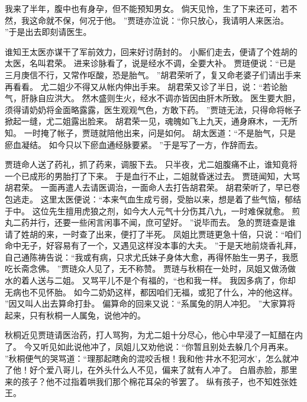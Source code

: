 我来了半年，腹中也有身孕，但不能预知男女。
倘天见怜，生了下来还可，若不然，我这命就不保，何况于他。
”贾琏亦泣说：“你只放心，我请明人来医治。
”于是出去即刻请医生。
\par
谁知王太医亦谋干了军前效力，回来好讨荫封的。
小厮们走去，便请了个姓胡的太医，名叫君荣。
进来诊脉看了，说是经水不调，全要大补。
贾琏便说：“已是三月庚信不行，又常作呕酸，恐是胎气。
”胡君荣听了，复又命老婆子们请出手来再看看。
尤二姐少不得又从帐内伸出手来。
胡君荣又诊了半日，说：“若论胎气，肝脉自应洪大。
然木盛则生火，经水不调亦皆因由肝木所致。
医生要大胆，须得请奶奶将金面略露露，医生观观气色，方敢下药。
”贾琏无法，只得命将帐子掀起一缝，尤二姐露出脸来。
胡君荣一见，魂魄如飞上九天，通身麻木，一无所知。
一时掩了帐子，贾琏就陪他出来，问是如何。
胡太医道：“不是胎气，只是瘀血凝结。
如今只以下瘀血通经脉要紧。
”于是写了一方，作辞而去。
\par
贾琏命人送了药礼，抓了药来，调服下去。
只半夜，尤二姐腹痛不止，谁知竟将一个已成形的男胎打了下来。
于是血行不止，二姐就昏迷过去。
贾琏闻知，大骂胡君荣。
一面再遣人去请医调治，一面命人去打告胡君荣。
胡君荣听了，早已卷包逃走。
这里太医便说：“本来气血生成亏弱，受胎以来，想是着了些气恼，郁结于中。
这位先生擅用虎狼之剂，如今大人元气十分伤其八九，一时难保就愈。
煎丸二药并行，还要一些闲言闲事不闻，庶可望好。
”说毕而去。
急的贾琏查是谁请了姓胡的来，一时查了出来，便打了半死。
凤姐比贾琏更急十倍，只说：“咱们命中无子，好容易有了一个，又遇见这样没本事的大夫。
”于是天地前烧香礼拜，自己通陈祷告说：“我或有病，只求尤氏妹子身体大愈，再得怀胎生一男子，我愿吃长斋念佛。
”贾琏众人见了，无不称赞。
贾琏与秋桐在一处时，凤姐又做汤做水的着人送与二姐。
又骂平儿不是个有福的，“也和我一样。
我因多病了，你却无病也不见怀胎。
如今二奶奶这样，都因咱们无福，或犯了什么，冲的他这样。
”因又叫人出去算命打卦。
偏算命的回来又说：“系属兔的阴人冲犯。
”大家算将起来，只有秋桐一人属兔，说他冲的。
\par
秋桐近见贾琏请医治药，打人骂狗，为尤二姐十分尽心，他心中早浸了一缸醋在内了。
今又听见如此说他冲了，凤姐儿又劝他说：“你暂且别处去躲几个月再来。
”秋桐便气的哭骂道：“理那起瞎肏的混咬舌根！我和他‘井水不犯河水’，怎么就冲了他！好个爱八哥儿，在外头什么人不见，偏来了就有人冲了。
白眉赤脸，那里来的孩子？他不过指着哄我们那个棉花耳朵的爷罢了。
纵有孩子，也不知姓张姓王。
